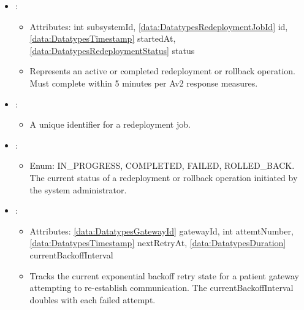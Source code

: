 \begin{itemize}[nolistsep,noitemsep]
\item {}: 
\begin{itemize}[noitemsep,nolistsep]
\item[] Attributes: int subsystemId, \ref{data:DatatypesRedeploymentJobId} id, \ref{data:DatatypesTimestamp} startedAt, \ref{data:DatatypesRedeploymentStatus} status
\item[] Represents an active or completed redeployment or rollback 
  operation. Must complete within 5 minutes per Av2 response 
  measures.
\end{itemize}

\item {}: 
\begin{itemize}[noitemsep,nolistsep]

\item[] A unique identifier for a redeployment job.
\end{itemize}

\item {}: 
\begin{itemize}[noitemsep,nolistsep]

\item[] Enum: IN\_PROGRESS, COMPLETED, FAILED, ROLLED\_BACK.
  The current status of a redeployment or rollback operation 
  initiated by the system administrator.
\end{itemize}

\item {}: 
\begin{itemize}[noitemsep,nolistsep]
\item[] Attributes: \ref{data:DatatypesGatewayId} gatewayId, int attemtNumber, \ref{data:DatatypesTimestamp} nextRetryAt, \ref{data:DatatypesDuration} currentBackoffInterval
\item[]  Tracks the current exponential backoff retry state for a 
  patient gateway attempting to re-establish communication. 
  The currentBackoffInterval doubles with each failed attempt.
\end{itemize}


\end{itemize}
